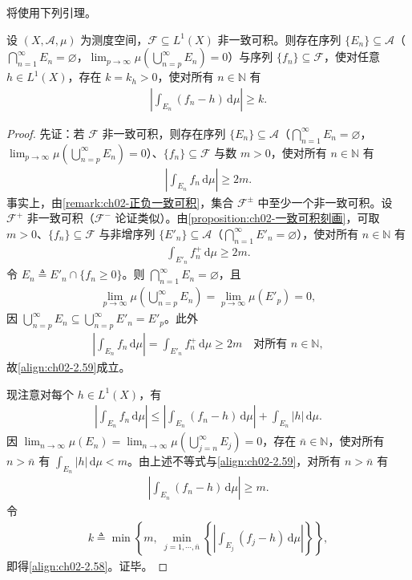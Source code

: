 \documentclass[../../main.tex]{subfiles}%
\begin{document}
将使用下列引理。

\begin{lemma}\label{lemma:ch02-非一致可积}
设 $(X,\mathscr A,\mu)$ 为测度空间，$\mathscr F\subseteq L^1(X)$ 非一致可积。则存在序列 $\{E_n\}\subseteq\mathscr A$（$\bigcap_{n=1}^\infty E_n=\varnothing $，$\lim_{p\to\infty}\mu(\bigcup_{n=p}^\infty E_n)=0$）与序列 $\{f_n\}\subseteq\mathscr F$，使对任意 $h\in L^1(X)$，存在 $k=k_h>0$，使对所有 $n\in\mathbb N$ 有
\begin{align}
\left|\int_{E_n}(f_n-h)\,\mathrm{d}\mu\right|\geqslant k. \label{align:ch02-2.58}
\end{align}
\end{lemma}

\begin{proof}
先证：若 $\mathscr F$ 非一致可积，则存在序列 $\{E_n\}\subseteq\mathscr A$（$\bigcap_{n=1}^\infty E_n=\varnothing $，$\lim_{p\to\infty}\mu(\bigcup_{n=p}^\infty E_n)=0$）、$\{f_n\}\subseteq\mathscr F$ 与数 $m>0$，使对所有 $n\in\mathbb N$ 有
\begin{align}
\left|\int_{E_n}f_n\,\mathrm{d}\mu\right|\geqslant 2m. \label{align:ch02-2.59}
\end{align}
事实上，由\cref{remark:ch02-正负一致可积}，集合 $\mathscr F^\pm$ 中至少一个非一致可积。设 $\mathscr F^+$ 非一致可积（$\mathscr F^-$ 论证类似）。由\cref{proposition:ch02-一致可积刻画}，可取 $m>0$、$\{f_n\}\subseteq\mathscr F$ 与非增序列 $\{E'_n\}\subseteq\mathscr A$（$\bigcap_{n=1}^\infty E'_n=\varnothing $），使对所有 $n\in\mathbb N$ 有
\begin{align*}
\int_{E'_n}f_n^+\,\mathrm{d}\mu\geqslant 2m.
\end{align*}
令 $E_n\triangleq E'_n\cap\{f_n\geqslant0\}$。则 $\bigcap_{n=1}^\infty E_n=\varnothing $，且
\begin{align*}
\lim_{p\to\infty}\mu\left(\bigcup_{n=p}^\infty E_n\right)
=\lim_{p\to\infty}\mu(E'_p)=0,
\end{align*}
因 $\bigcup_{n=p}^\infty E_n\subseteq\bigcup_{n=p}^\infty E'_n=E'_p$。此外
\begin{align*}
\left|\int_{E_n}f_n\,\mathrm{d}\mu\right|=\int_{E'_n}f_n^+\,\mathrm{d}\mu\geqslant 2m\quad\text{对所有 }n\in\mathbb N,
\end{align*}
故\eqref{align:ch02-2.59}成立。

现注意对每个 $h\in L^1(X)$，有
\begin{align*}
\left|\int_{E_n}f_n\,\mathrm{d}\mu\right|
\leqslant\left|\int_{E_n}(f_n-h)\,\mathrm{d}\mu\right|+\int_{E_n}|h|\,\mathrm{d}\mu.
\end{align*}
因 $\lim_{n\to\infty}\mu(E_n)=\lim_{n\to\infty}\mu(\bigcup_{j=n}^\infty E_j)=0$，存在 $\bar n\in\mathbb N$，使对所有 $n>\bar n$ 有 $\int_{E_n}|h|\,\mathrm{d}\mu<m$。由上述不等式与\eqref{align:ch02-2.59}，对所有 $n>\bar n$ 有
\begin{align*}
\left|\int_{E_n}(f_n-h)\,\mathrm{d}\mu\right|\geqslant m.
\end{align*}
令
\begin{align*}
k\triangleq \min\left\{m,\ \min_{j=1,\cdots ,\bar n}\left\{\left|\int_{E_j}(f_j-h)\,\mathrm{d}\mu\right|\right\}\right\},
\end{align*}
即得\eqref{align:ch02-2.58}。证毕。
\end{proof}
\end{document}
